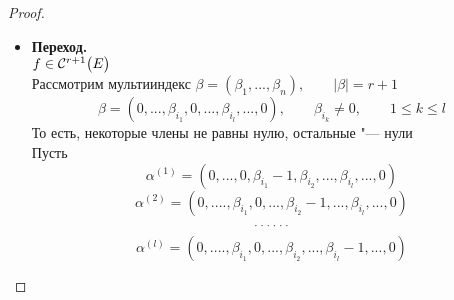 \begin{proof}
\begin{itemize}
		Всё это означает, что , что
		\begin{equ}{r_order:15}
			g'(0) \iseq \sum_{\nu = 1}^n f_{x_\nu}'(Y) h_\nu
		\end{equ}
		По условию, $ f \in \Cont[1]{E} $, а значит, применяя теорему о достаточном условии дифференцируемости, $ f $ дифф. в $ X \quad \forall X \in E $ \\
		Рассмотрим отображение
		$$ \Psi : (-a, a) \to \R^n, \qquad \Psi(t) = Y + tH $$
		$$ g(t) \bydef f(\Psi(t)), \qquad f : E \to \R^1 $$
		То есть, $ g : (-a, a) \to \R^1 $ и можно применить теорему о дифференцируемости суперпозиции дифференцируемых отображений:
		\begin{equ}{r_order:18}
			g(t) = f(V) \cdot \mathcal{D}\Psi(t)
		\end{equ}
		Матрица Якоби для отображения $ \R^1 \to \R^1 $ "--- матрица $ 1 \times 1 $:
		\begin{equ}{r_order:19'}
			g(t) = g'(t)
		\end{equ}
		$ f : \R^n \to \R^1 $, значит, её матрица Якоби "--- это вектор-строка:
		\begin{equ}{r_order:19}
			f(V) = \bigg( f_{x_1}'(Y + tH), \dots, f_{x_n}'(Y + tH) \bigg)
		\end{equ}
		\begin{equ}{r_order:20}
			\Psi(t) = \column{h_1}{h_n}
		\end{equ}
		\begin{equ}{r_order:21}
			, , ,  \implies g'(t) = \sum_{\nu = 1}^n f_{x_\nu}'(Y + tH)h_\nu, \qquad t \in (-a, a)
		\end{equ}
		Подставляя $ t = 0 $, получаем \eref{r_order:15}
		\item \textbf{Переход.} \\
		$ f \in \Cont[r + 1]E $ \\
		Рассмотрим мультииндекс $ \beta = (\beta_1, ..., \beta_n), \qquad |\beta| = r + 1 $
		$$ \beta = (0, ..., \beta_{i_1}, 0, ..., \beta_{i_l}, ..., 0), \qquad \beta_{i_k} \ne 0, \qquad 1 \le k \le l $$
		То есть, некоторые члены не равны нулю, остальные "--- нули \\
		Пусть
		$$ \alpha^{(1)} = (0, ..., 0, \beta_{i_1} - 1, \beta_{i_2}, ..., \beta_{i_l}, ..., 0) $$
		$$ \alpha^{(2)} = (0, ...., \beta_{i_1}, 0, ..., \beta_{i_2} - 1, ..., \beta_{i_l}, ..., 0) $$
		$$ \widedots $$
		$$ \alpha^{(l)} = (0, ...., \beta_{i_1}, 0, ..., \beta_{i_2}, ..., \beta_{i_l} - 1, ..., 0) $$

\end{itemize}
\end{proof}
